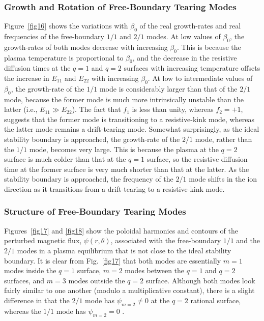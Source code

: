 \documentclass[12pt,prb,aps]{revtex4-1}
\begin{document}
\subsubsection{Growth and Rotation of Free-Boundary Tearing Modes}
Figure~\ref{fig16} shows the variations  with $\beta_0$ of the real growth-rates and real frequencies of the free-boundary $1/1$ and $2/1$ modes.  At low values of $\beta_0$, the growth-rates of both modes decrease with increasing
$\beta_0$. This is because  the plasma temperature is proportional to $\beta_0$, and the decrease in the resistive diffusion times at the $q=1$ and $q=2$ surfaces
with increasing temperature offsets the increase in $E_{11}$ and $E_{22}$ with increasing $\beta_0$. 
At low to intermediate values of $\beta_0$, the growth-rate
of the $1/1$ mode is considerably larger than that of the $2/1$ mode, because the former mode is much more intrinsically
unstable than the latter (i.e., $E_{11}\gg E_{22}$). The fact that $f_1$ is less than unity, whereas $f_2=+1$,  suggests that the former mode is transitioning to a resistive-kink mode,
whereas the latter mode remains a drift-tearing mode.\cite{ara} Somewhat surprisingly, as the ideal stability boundary is approached, the growth-rate of the
$2/1$ mode, rather than the $1/1$ mode, becomes very large.  This is because
the plasma at the $q=2$ surface is much colder than that at the $q=1$ surface, so the resistive diffusion time at the former surface is very much  shorter than
that at the latter. As the stability boundary is approached, the frequency of the  $2/1$ mode shifts  in the ion direction as it
transitions from a drift-tearing to a resistive-kink mode.\cite{ara}

\subsubsection{Structure of Free-Boundary Tearing Modes}
Figures~\ref{fig17} and \ref{fig18} show the poloidal harmonics and contours of the perturbed magnetic flux, $\psi(r,\theta)$, associated
with the free-boundary $1/1$ and the $2/1$ modes in a  plasma equilibrium that is not close to the ideal stability boundary. It is clear from Fig.~\ref{fig17} that both modes are essentially $m=1$ modes inside the $q=1$ surface, $m=2$ modes between
the $q=1$ and $q=2$  surfaces, and $m=3$ modes outside the $q=2$  surface. Although both modes look fairly similar to
one another (modulo a multiplicative constant), there is a slight difference in that the $2/1$ mode has $\psi_{m=2}\neq 0$ at the $q=2$ rational surface, whereas the $1/1$ mode has 
$\psi_{m=2}=0$ .
\end{document}
